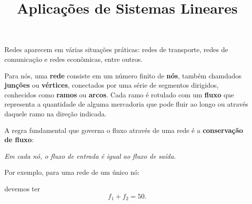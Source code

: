 \documentclass{beamer}
\title{Aplicações de Sistemas Lineares}
\author[\autor]{\autor}
\institute[\instituto]{\instituto}
\date{}
\begin{document}
    \begin{frame}
        \maketitle
    \end{frame}


    \begin{frame}

        Redes aparecem em várias situações práticas: redes de transporte, redes de comunicação e redes econômicas, entre outros.

        Para nós, uma \textbf{rede} consiste em um número finito de \textbf{nós}, também chamdados \textbf{junções} ou \textbf{vértices}, conectados por uma série de segmentos
        dirigidos, conhecidos como \textbf{ramos} ou \textbf{arcos}. Cada ramo é rotulado com um \textbf{fluxo} que representa a quantidade de alguma mercadoria que pode fluir ao longo ou através daquele ramo na direção indicada. 

    \end{frame}

    \begin{frame}
        A regra fundamental que governa o fluxo através de uma rede é a \textbf{conservação de fluxo}:
        \begin{center}
          \textit{Em cada nó, o fluxo de entrada é igual ao fluxo de saída.}
        \end{center}
    \end{frame}

    \begin{frame}
        Por exemplo, para uma rede de um único nó:
        \begin{figure}[!h]
            \centering
            
        \end{figure}
        devemos ter
        \[
            f_1 + f_2 = 50.
        \]
    \end{frame}

    \begin{frame}
        \begin{figure}[!h]
            \centering
            
        \end{figure}
    \end{frame}
\end{document}
